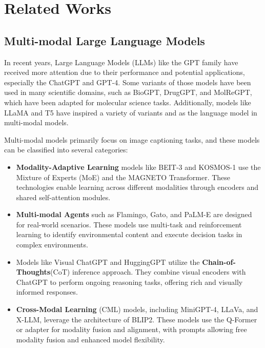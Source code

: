 \documentclass{article}
\begin{document}
\section{Related Works}


\subsection{Multi-modal Large Language Models}
In recent years, Large Language Models (LLMs) like the GPT\cite{floridi2020gpt} family have received more attention due to their performance and potential applications, especially the ChatGPT and GPT-4. Some variants of those models have been used in many scientific domains, such as BioGPT\cite{luo2022biogpt}, DrugGPT\cite{li2023druggpt}, and MolReGPT\cite{li2023empowering}, which have been adapted for molecular science tasks. Additionally, models like LLaMA and T5 have inspired a variety of variants and as the language model in multi-modal models.
 
Multi-modal models primarily focus on image captioning tasks\cite{stefanini2022show}, and these models can be classified into several categories:
\begin{itemize}
\item \textbf{Modality-Adaptive Learning} models like BEIT-3\cite{wang2022image} and KOSMOS-1\cite{huang2023language} use the Mixture of Experts (MoE)\cite{bao2022vlmo} and the MAGNETO\cite{wang2022foundation} Transformer. These technologies enable learning across different modalities through encoders and shared self-attention modules.
\item \textbf{Multi-modal Agents} such as Flamingo\cite{alayrac2022flamingo}, Gato\cite{reed2022generalist}, and PaLM-E\cite{driess2023palm} are designed for real-world scenarios. These models use multi-task and reinforcement learning to identify environmental content and execute decision tasks in complex environments.
\item Models like Visual ChatGPT\cite{wu2023visual} and HuggingGPT\cite{shen2023hugginggpt} utilize the \textbf{Chain-of-Thoughts}(CoT)\cite{wei2022chain} inference approach. They combine visual encoders with ChatGPT to perform ongoing reasoning tasks, offering rich and visually informed responses.
\item \textbf{Cross-Modal Learning} (CML) models, including MiniGPT-4\cite{zhu2023minigpt}, LLaVa\cite{liu2023visual}, and X-LLM\cite{chen2023x}, leverage the architecture of BLIP2. These models use the Q-Former or adapter for modality fusion and alignment, with prompts allowing free modality fusion and enhanced model flexibility.
\end{itemize}
\end{document}
